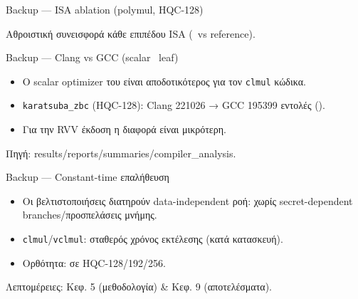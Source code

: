 \documentclass[aspectratio=169,10pt]{beamer}
\begin{document}
\begin{frame}{Backup — ISA ablation (polymul, HQC-128)}
  \begin{center}
  \end{center}
  \centering\footnotesize\textcolor{neutral}{Αθροιστική συνεισφορά κάθε επιπέδου ISA (\instret\ vs reference).}
\end{frame}

\begin{frame}{Backup — Clang vs GCC (scalar \Zbc\ leaf)}
  \begin{itemize}
    \item Ο scalar optimizer του  είναι αποδοτικότερος για τον \texttt{clmul} κώδικα.
    \item \texttt{karatsuba\_zbc} (HQC-128): Clang \num{221026} → GCC \num{195399} εντολές ().
    \item Για την RVV έκδοση η διαφορά είναι μικρότερη.
  \end{itemize}
  \centering\footnotesize\textcolor{neutral}{Πηγή: results/reports/summaries/compiler\_analysis.}
\end{frame}

\begin{frame}{Backup — Constant-time επαλήθευση}
  \begin{itemize}
    \item Οι βελτιστοποιήσεις διατηρούν data-independent ροή: χωρίς secret-dependent branches/προσπελάσεις μνήμης.
    \item \texttt{clmul}/\texttt{vclmul}: σταθερός χρόνος εκτέλεσης (κατά κατασκευή).
    \item Ορθότητα:  σε HQC-128/192/256.
  \end{itemize}
  \centering\footnotesize\textcolor{neutral}{Λεπτομέρειες: Κεφ. 5 (μεθοδολογία) \& Κεφ. 9 (αποτελέσματα).}
\end{frame}
\end{document}
